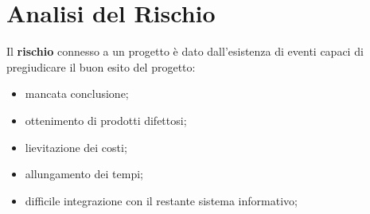 \section{Analisi del Rischio}\label{sec:ftt_analisi_del_rischio} %
Il \textbf{rischio} connesso a un progetto è dato dall'esistenza di eventi capaci di pregiudicare il buon esito del progetto:
\begin{itemize}
    \item mancata conclusione;
    \item ottenimento di prodotti difettosi;
    \item lievitazione dei costi;
    \item allungamento dei tempi;
    \item difficile integrazione con il restante sistema informativo;
\end{itemize}
